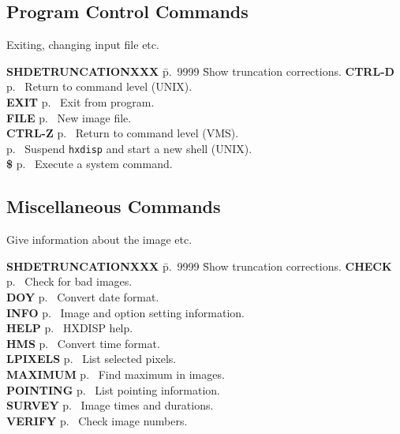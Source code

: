 \subsection{Program Control Commands}

Exiting, changing input file etc.

\begin{tabbing}
{\bf SHDETRUNCATIONXXX} \= p.~9999 \= Show truncation corrections.\kill
{\bf CTRL-D} \> p.~\pageref{eof} \> Return to command level (UNIX).\\ 
{\bf EXIT} \> p.~\pageref{ex} \> Exit from program.\\ 
{\bf FILE} \> p.~\pageref{fil} \> New image file.\\ 
{\bf CTRL-Z} \> p.~\pageref{eof} \> Return to command level (VMS). \\
\> p.~\pageref{dcl} \>  Suspend \verb!hxdisp! and start a
new shell (UNIX).\\ 
{\bf \$} \> p.~\pageref{dcl} \> Execute a system command.\\
\end{tabbing}

\subsection{Miscellaneous Commands}

Give information about the image etc.

\begin{tabbing}
{\bf SHDETRUNCATIONXXX} \= p.~9999 \= Show truncation corrections.\kill
{\bf CHECK} \> p.~\pageref{ch} \> Check for bad images.\\ 
{\bf DOY} \> p.~\pageref{do} \> Convert date format.\\ 
{\bf INFO} \> p.~\pageref{inf} \> Image and option setting
information.\\ 
{\bf HELP} \> p.~\pageref{he} \> HXDISP help.\\ 
{\bf HMS} \> p.~\pageref{hm} \> Convert time format.\\ 
{\bf LPIXELS} \> p.~\pageref{lp} \> List selected pixels.\\ 
{\bf MAXIMUM} \> p.~\pageref{max} \> Find maximum in images.\\ 
{\bf POINTING} \> p.~\pageref{po} \> List pointing information.\\ 
{\bf SURVEY} \> p.~\pageref{sur} \> Image times and durations.\\ 
{\bf VERIFY} \> p.~\pageref{ve} \> Check image numbers.\\
\end{tabbing}

